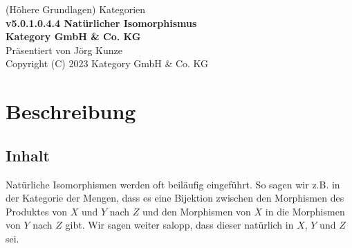 \documentclass[a4paper]{amsart}
\theoremstyle{definition}
\begin{document}
\begin{titlepage}
\centering
{\huge
(Höhere Grundlagen) Kategorien\\[1cm]
\textbf{v5.0.1.0.4.4 Natürlicher Isomorphismus}
}\\[1cm]

\textbf{Kategory GmbH \& Co. KG}\\
Präsentiert von Jörg Kunze\\
Copyright (C) 2023 Kategory GmbH \& Co. KG

\end{titlepage}

%

\newpage

\section*{Beschreibung}

\subsection*{Inhalt}
Natürliche Isomorphismen werden oft beiläufig eingeführt. So sagen wir z.B. in der Kategorie der Mengen, dass es eine Bijektion zwischen den Morphismen des Produktes von $X$ und $Y$ nach $Z$ und den Morphismen von $X$ in die Morphismen von $Y$ nach $Z$ gibt. Wir sagen weiter salopp, dass dieser natürlich in $X$, $Y$ und $Z$ sei.
\end{document}

